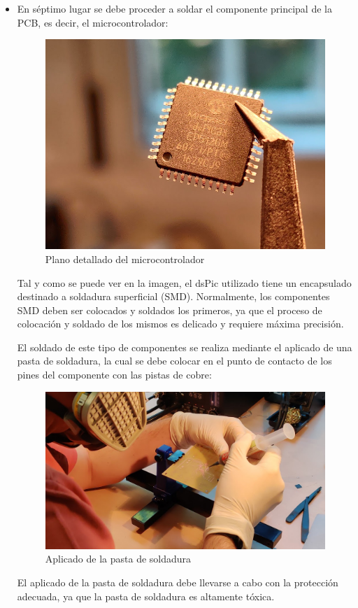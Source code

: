 \begin{itemize}
    \item En séptimo lugar se debe proceder a soldar el componente principal de la PCB, es decir, el microcontrolador:
    
    \begin{figure}[H]
    \centering 
    \includegraphics[width=0.5\linewidth]{pictures/DSPIC.jpg}
    \caption{Plano detallado del microcontrolador}
    \label{fig:kdiagram}
    \end{figure}
    
    Tal y como se puede ver en la imagen, el dsPic utilizado tiene un encapsulado destinado a soldadura superficial (SMD). Normalmente, los componentes SMD deben ser colocados y soldados los primeros, ya que el proceso de colocación y soldado de los mismos es delicado y requiere máxima precisión.
    
    El soldado de este tipo de componentes se realiza mediante el aplicado de una pasta de soldadura, la cual se debe colocar en el punto de contacto de los pines del componente con las pistas de cobre:
    
    \begin{figure}[H]
    \centering 
    \includegraphics[width=0.65\linewidth]{pictures/SMD2.jpg}
    \caption{Aplicado de la pasta de soldadura}
    \label{fig:kdiagram}
    \end{figure}
    
    El aplicado de la pasta de soldadura debe llevarse a cabo con la protección adecuada, ya que la pasta de soldadura es altamente tóxica.
    

\end{itemize}
